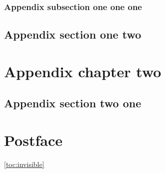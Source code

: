 \documentclass{book}
\begin{document}
\subsection{Appendix subsection one one one}
\section{Appendix section one two}

\chapter{Appendix chapter two}
\section{Appendix section two one}

\backmatter

\chapter{Postface}
\localtableofcontents*\ref{toc:invisible}

\tableofcontents*

\etocobeydepthtags
{}
\renewcommand\contentsname{Contents with depth tags}
\tableofcontents*
\etocignoredepthtags
\end{document}
